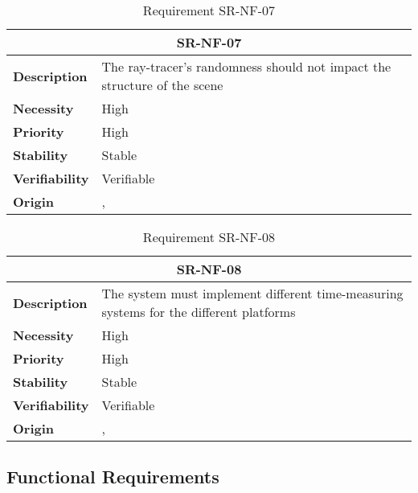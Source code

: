 \begin{table}[H]
    \centering
    \begin{tabular}{l p{10cm}}
        \toprule
        \multicolumn{2}{c}{SR-NF-07} \\
        \toprule
        \textbf{Description}        & The ray-tracer's randomness should not impact the structure of the scene \\
        \textbf{Necessity}          &  High \\
        \textbf{Priority}           &  High \\
        \textbf{Stability}          &  Stable \\
        \textbf{Verifiability}      & Verifiable \\
        \textbf{Origin}             & \textit{\nameref{tab:ur-ca-10}}, \textit{\nameref{tab:ur-ca-14}} \\
    \end{tabular}
    \caption{Requirement SR-NF-07}
    \label{tab:sr-nf-07}
\end{table}

\begin{table}[H]
    \centering
    \begin{tabular}{l p{10cm}}
        \toprule
        \multicolumn{2}{c}{SR-NF-08} \\
        \toprule
        \textbf{Description}        &  The system must implement different time-measuring systems for the different platforms\\
        \textbf{Necessity}          &  High \\
        \textbf{Priority}           &  High \\
        \textbf{Stability}          &  Stable \\
        \textbf{Verifiability}      & Verifiable \\
        \textbf{Origin}             & \textit{\nameref{tab:ur-ca-09}}, \textit{\nameref{tab:ur-ca-14}} \\
    \end{tabular}
    \caption{Requirement SR-NF-08}
    \label{tab:sr-nf-08}
\end{table}

\subsection{Functional Requirements}


